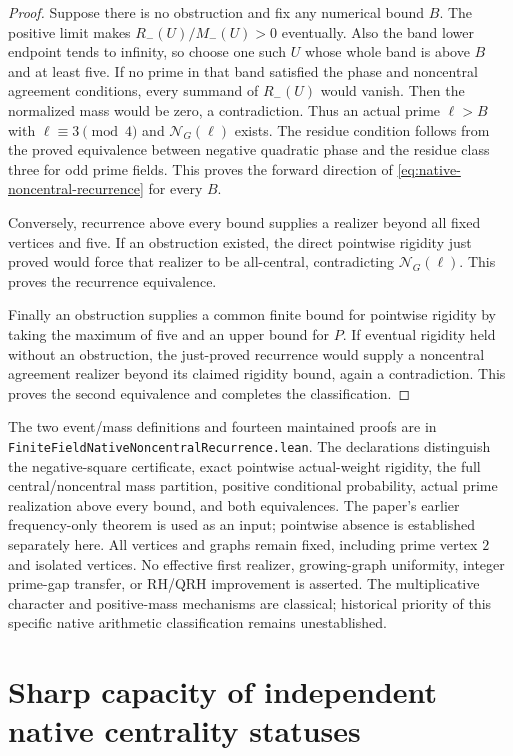 \documentclass[11pt]{article}
\begin{document}
\begin{proof}
Suppose there is no obstruction and fix any numerical bound \(B\).
The positive limit makes \(R_-(U)/M_-(U)>0\) eventually.
Also the band lower endpoint tends to infinity, so choose one such
\(U\) whose whole band is above \(B\) and at least five.
If no prime in that band satisfied the phase and noncentral agreement
conditions, every summand of \(R_-(U)\) would vanish.
Then the normalized mass would be zero, a contradiction.
Thus an actual prime \(\ell>B\) with
\(\ell\equiv3\pmod4\) and \(\mathcal N_G(\ell)\) exists.
The residue condition follows from the proved equivalence between
negative quadratic phase and the residue class three for odd prime
fields. This proves the forward direction of
\eqref{eq:native-noncentral-recurrence} for every \(B\).

Conversely, recurrence above every bound supplies a realizer beyond
all fixed vertices and five. If an obstruction existed, the direct
pointwise rigidity just proved would force that realizer to be
all-central, contradicting \(\mathcal N_G(\ell)\).
This proves the recurrence equivalence.

Finally an obstruction supplies a common finite bound for pointwise
rigidity by taking the maximum of five and an upper bound for \(P\).
If eventual rigidity held without an obstruction, the just-proved
recurrence would supply a noncentral agreement realizer beyond its
claimed rigidity bound, again a contradiction. This proves the second
equivalence and completes the classification.
\end{proof}

The two event/mass definitions and fourteen maintained proofs are in
\texttt{FiniteFieldNativeNoncentralRecurrence.lean}.
The declarations distinguish the negative-square certificate, exact
pointwise actual-weight rigidity, the full central/noncentral mass
partition, positive conditional probability, actual prime realization
above every bound, and both equivalences.
The paper's earlier frequency-only theorem is used as an input;
pointwise absence is established separately here.
All vertices and graphs remain fixed, including prime vertex \(2\)
and isolated vertices. No effective first realizer, growing-graph
uniformity, integer prime-gap transfer, or RH/QRH improvement is
asserted. The multiplicative character and positive-mass mechanisms
are classical; historical priority of this specific native arithmetic
classification remains unestablished.

\section{Sharp capacity of independent native centrality statuses}
\label{sec:native-profile-capacity}
\end{document}
